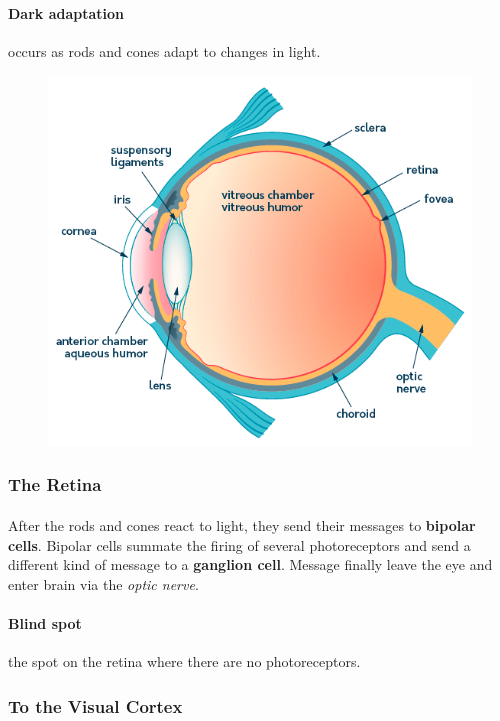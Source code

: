 \documentclass{article}
\begin{document}
	\paragraph{Dark adaptation} occurs as rods and cones adapt to changes in light.
	\begin{figure}
		\centering
		\includegraphics[width=\linewidth]{pic/AnatomyOfTheEye}
	\end{figure}
	\subsubsection{The Retina}
	\paragraph{} After the rods and cones react to light, they send their messages to \textbf{bipolar cells}. Bipolar cells summate the firing of several photoreceptors and send a different kind of message to a \textbf{ganglion cell}. Message finally leave the eye and enter brain via the \emph{optic nerve}.
	\paragraph{Blind spot} the spot on the retina where there are no photoreceptors.
	\subsubsection{To the Visual Cortex}
\end{document}
